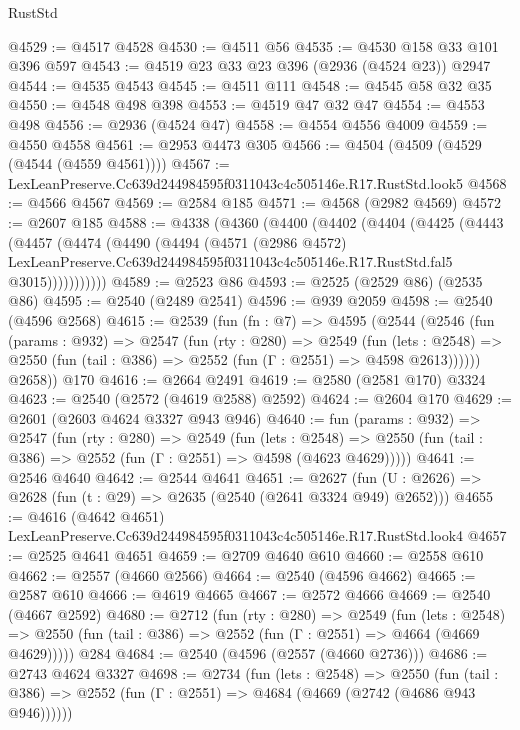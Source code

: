\begin{lexlean}{RustStd}
\begin{coremodule}
@4529 := @4517 @4528
@4530 := @4511 @56
@4535 := @4530 @158 @33 @101 @396 @597
@4543 := @4519 @23 @33 @23 @396 (@2936 (@4524 @23)) @2947
@4544 := @4535 @4543
@4545 := @4511 @111
@4548 := @4545 @58 @32 @35
@4550 := @4548 @498 @398
@4553 := @4519 @47 @32 @47
@4554 := @4553 @498
@4556 := @2936 (@4524 @47)
@4558 := @4554 @4556 @4009
@4559 := @4550 @4558
@4561 := @2953 @4473 @305
@4566 := @4504 (@4509 (@4529 (@4544 (@4559 @4561))))
@4567 := LexLeanPreserve.Cc639d244984595f0311043c4c505146e.R17.RustStd.look5
@4568 := @4566 @4567
@4569 := @2584 @185
@4571 := @4568 (@2982 @4569)
@4572 := @2607 @185
@4588 := @4338
    (@4360
      (@4400
        (@4402
          (@4404
            (@4425
              (@4443
                (@4457
                  (@4474
                    (@4490
                      (@4494
                        (@4571
                          (@2986 @4572)
                          LexLeanPreserve.Cc639d244984595f0311043c4c505146e.R17.RustStd.fal5
                          @3015)))))))))))
@4589 := @2523 @86
@4593 := @2525 (@2529 @86) (@2535 @86)
@4595 := @2540 (@2489 @2541)
@4596 := @939 @2059
@4598 := @2540 (@4596 @2568)
@4615 := @2539
    (fun (fn : @7) =>
    @4595
      (@2544
        (@2546
          (fun (params : @932) =>
          @2547
            (fun (rty : @280) =>
            @2549
              (fun (lets : @2548) =>
              @2550 (fun (tail : @386) => @2552 (fun (Γ : @2551) => @4598 @2613))))))
        @2658))
    @170
@4616 := @2664 @2491
@4619 := @2580 (@2581 @170) @3324
@4623 := @2540 (@2572 (@4619 @2588) @2592)
@4624 := @2604 @170
@4629 := @2601 (@2603 @4624 @3327 @943 @946)
@4640 := fun (params : @932) =>
  @2547
    (fun (rty : @280) =>
    @2549
      (fun (lets : @2548) =>
      @2550 (fun (tail : @386) => @2552 (fun (Γ : @2551) => @4598 (@4623 @4629)))))
@4641 := @2546 @4640
@4642 := @2544 @4641
@4651 := @2627 (fun (U : @2626) => @2628 (fun (t : @29) => @2635 (@2540 (@2641 @3324 @949) @2652)))
@4655 := @4616 (@4642 @4651) LexLeanPreserve.Cc639d244984595f0311043c4c505146e.R17.RustStd.look4
@4657 := @2525 @4641 @4651
@4659 := @2709 @4640 @610
@4660 := @2558 @610
@4662 := @2557 (@4660 @2566)
@4664 := @2540 (@4596 @4662)
@4665 := @2587 @610
@4666 := @4619 @4665
@4667 := @2572 @4666
@4669 := @2540 (@4667 @2592)
@4680 := @2712
    (fun (rty : @280) =>
    @2549
      (fun (lets : @2548) =>
      @2550 (fun (tail : @386) => @2552 (fun (Γ : @2551) => @4664 (@4669 @4629)))))
    @284
@4684 := @2540 (@4596 (@2557 (@4660 @2736)))
@4686 := @2743 @4624 @3327
@4698 := @2734
    (fun (lets : @2548) =>
    @2550 (fun (tail : @386) => @2552 (fun (Γ : @2551) => @4684 (@4669 (@2742 (@4686 @943 @946))))))

\end{coremodule}
\end{lexlean}
